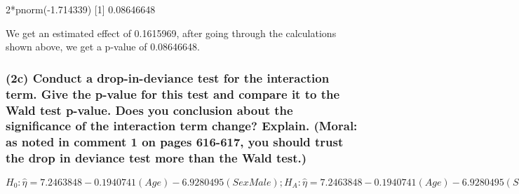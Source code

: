 \documentclass[
]{article}
\newenvironment{Shaded}{\begin{snugshade}}{\end{snugshade}}
\newcommand{\DecValTok}[1]{\textcolor[rgb]{0.00,0.00,0.81}{#1}}
\newcommand{\FloatTok}[1]{\textcolor[rgb]{0.00,0.00,0.81}{#1}}
\newcommand{\FunctionTok}[1]{\textcolor[rgb]{0.00,0.00,0.00}{#1}}
\newcommand{\NormalTok}[1]{#1}
\newcommand{\SpecialCharTok}[1]{\textcolor[rgb]{0.00,0.00,0.00}{#1}}
\begin{document}
\begin{Shaded}
\begin{Highlighting}[]
\DecValTok{2}\SpecialCharTok{*}\FunctionTok{pnorm}\NormalTok{(}\SpecialCharTok{{-}}\FloatTok{1.714339}\NormalTok{)}
\NormalTok{[}\DecValTok{1}\NormalTok{] }\FloatTok{0.08646648}
\end{Highlighting}
\end{Shaded}

We get an estimated effect of 0.1615969, after going through the
calculations shown above, we get a p-value of 0.08646648.

\hypertarget{c-conduct-a-drop-in-deviance-test-for-the-interaction-term.-give-the-p-value-for-this-test-and-compare-it-to-the-wald-test-p-value.-does-you-conclusion-about-the-significance-of-the-interaction-term-change-explain.-moral-as-noted-in-comment-1-on-pages-616-617-you-should-trust-the-drop-in-deviance-test-more-than-the-wald-test.}{%
\subsubsection{(2c) Conduct a drop-in-deviance test for the interaction
term. Give the p-value for this test and compare it to the Wald test
p-value. Does you conclusion about the significance of the interaction
term change? Explain. (Moral: as noted in comment 1 on pages 616-617,
you should trust the drop in deviance test more than the Wald
test.)}\label{c-conduct-a-drop-in-deviance-test-for-the-interaction-term.-give-the-p-value-for-this-test-and-compare-it-to-the-wald-test-p-value.-does-you-conclusion-about-the-significance-of-the-interaction-term-change-explain.-moral-as-noted-in-comment-1-on-pages-616-617-you-should-trust-the-drop-in-deviance-test-more-than-the-wald-test.}}

\(H_{0}: \hat \eta = 7.2463848 - 0.1940741(Age) - 6.9280495(SexMale); H_{A}: \hat \eta = 7.2463848 - 0.1940741(Age) - 6.9280495(SexMale) + 0.1615969(Age)(SexMale)\)
\end{document}
